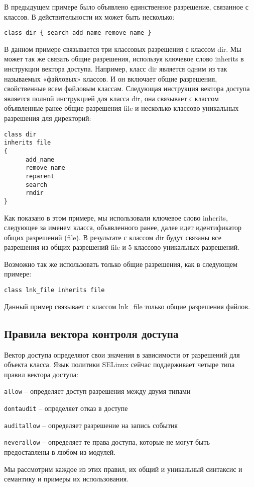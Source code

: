\documentclass{./../class/UIR}
\begin{document}
    В предыдущем примере было объявлено единственное разрешение, связанное с
    классов. В действительности их может быть несколько:
\begin{verbatim}
class dir { search add_name remove_name }
\end{verbatim}
    В данном примере связывается три классовых разрешения с классом dir. Мы
    может так же связать общие разрешения, используя ключевое слово inherits в
    инструкции вектора доступа. Например, класс dir является одним из так
    называемых «файловых» классов. И он включает общие разрешения, свойственные
    всем файловым классам. Следующая инструкция вектора доступа является полной
    инструкцией для класса dir, она связывает с классом объявленные ранее общие
    разрешения file и несколько классово уникальных разрешения для директорий:
\begin{verbatim}
class dir
inherits file
{
      add_name
	  remove_name
      reparent
      search
      rmdir
}
\end{verbatim}
    Как показано в этом примере, мы использовали ключевое слово inherits, следующее
    за именем класса, объявленного ранее, далее идет идентификатор общих разрешений
    (file). В результате с классом dir будут связаны все разрешения из общих
    разрешений file и 5 классово уникальных разрешений.

    Возможно так же использовать только общие разрешения, как в следующем примере:
    \begin{verbatim}
class lnk_file inherits file
    \end{verbatim}
    Данный пример связывает с классом lnk\_file только общие разрешения файлов.

\subsection{Правила вектора контроля доступа}

    Вектор доступа определяют свои значения в зависимости от разрешений для
    объекта класса. Язык политики SELinux сейчас поддерживает четыре типа правил
    вектора доступа:
    \begin{description}
      \item \verb"allow" – определяет доступ разрешения между двумя типами
      \item \verb"dontaudit" – определяет отказ в доступе
      \item \verb"auditallow" – определяет разрешение на запись события
      \item \verb"neverallow"  – определяет те права доступа, которые не могут
      быть предоставлены в любом из модулей.
    \end{description}
    Мы рассмотрим каждое из этих правил, их общий и уникальный синтаксис и
    семантику и примеры их использования.
\end{document}
